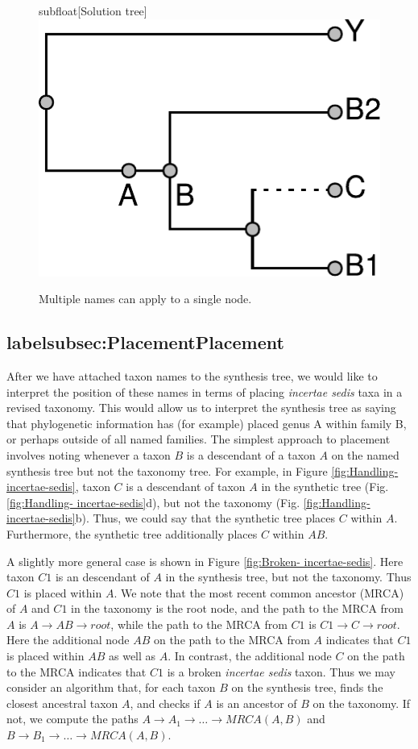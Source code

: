 \documentclass[english]{article}
\begin{document}
\begin{figure}
\hfill{}subfloat[Solution tree]{\includegraphics[scale=0.5]{Figures/names2nodes1/solution2-shaded}}
\hfill{}
\caption{\label{fig:Multiple-names-can}Multiple names can apply to a single node.}
\end{figure}

\emph{}

\subsection{label{subsec:Placement}Placement}

After we have attached taxon names to the synthesis tree, we would
like to interpret the position of these names in terms of placing
\emph{incertae sedis }taxa in a revised taxonomy. This would allow us
to interpret the synthesis tree as saying that phylogenetic
information has (for example) placed genus A within family B, or
perhaps outside of all named families. The simplest approach to
placement involves noting whenever a taxon $B$ is a descendant of a
taxon $A$ on the named synthesis tree but not the taxonomy tree. For
example, in Figure \ref{fig:Handling-incertae-sedis}, taxon $C$ is a
descendant of taxon $A$ in the synthetic tree (Fig. \ref{fig:Handling-
incertae-sedis}d), but not the taxonomy (Fig. \ref{fig:Handling-
incertae-sedis}b). Thus, we could say that the synthetic tree places
$C$ within $A$. Furthermore, the synthetic tree additionally places
$C$ within $AB$.

A slightly more general case is shown in Figure \ref{fig:Broken-
incertae-sedis}. Here taxon $C1$ is an descendant of $A$ in the
synthesis tree, but not the taxonomy. Thus $C1$ is placed within $A$.
We note that the most recent common ancestor (MRCA) of $A$ and $C1$ in
the taxonomy is the root node, and the path to the MRCA from $A$ is
$A\to AB\to root$, while the path to the MRCA from $C1$ is $C1\to C\to
root$. Here the additional node $AB$ on the path to the MRCA from $A$
indicates that $C1$ is placed within $AB$ as well as $A$. In contrast,
the additional node $C$ on the path to the MRCA indicates that $C1$ is
a broken \emph{incertae sedis} taxon. Thus we may consider an
algorithm that, for each taxon $B$ on the synthesis tree, finds the
closest ancestral taxon $A$, and checks if $A$ is an ancestor of $B$
on the taxonomy. If not, we compute the paths $A\to A_{1}\to\ldots\to
MRCA(A,B)$ and $B\to B_{1}\to\ldots\to MRCA(A,B)$.
\end{document}
